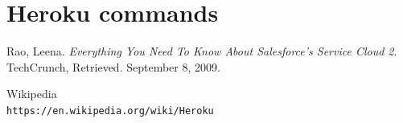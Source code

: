 \documentclass[12pt,a4paper]{article}
\begin{document}
\section{Heroku commands}


\begin{thebibliography}{bib}
	 Rao, Leena. 
	\textit{Everything You Need To Know About Salesforce's Service Cloud 2}. 
	TechCrunch, Retrieved. September 8, 2009.
	 
	
	Wikipedia
	\\\texttt{https://en.wikipedia.org/wiki/Heroku}
	
\end{thebibliography}
\end{document}
